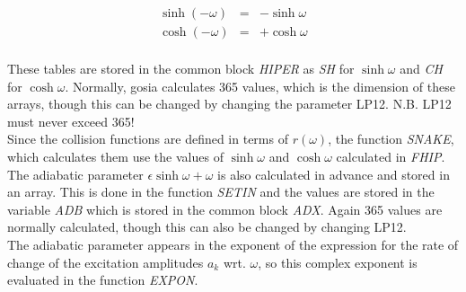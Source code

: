 \begin{eqnarray}
\sinh(-\omega) &=& -\sinh\omega\nonumber\\
\cosh(-\omega) &=& +\cosh\omega\nonumber\\
\end{eqnarray}

These tables are stored in the common block \emph{HIPER} as \emph{SH} for
$\sinh\omega$ and \emph{CH} for $\cosh\omega$. Normally, gosia calculates 365
values, which is the dimension of these arrays, though this can be changed
by changing the parameter LP12. N.B. LP12 must never exceed 365!\\

Since the collision functions are defined in terms of $r(\omega)$, the
function \emph{SNAKE}, which calculates them use the values of $\sinh\omega$
and $\cosh\omega$ calculated in \emph{FHIP}.\\

The adiabatic parameter $\epsilon \sinh \omega + \omega$ is also calculated
in advance and stored in an array. This is done in the function \emph{SETIN}
and the values are stored in the variable \emph{ADB} which is stored in the
common block \emph{ADX}. Again 365 values are normally calculated, though
this can also be changed by changing LP12.\\

The adiabatic parameter appears in the exponent of the expression for the
rate of change of the excitation amplitudes $a_k$ wrt. $\omega$, so this
complex exponent is evaluated in the function \emph{EXPON}.
